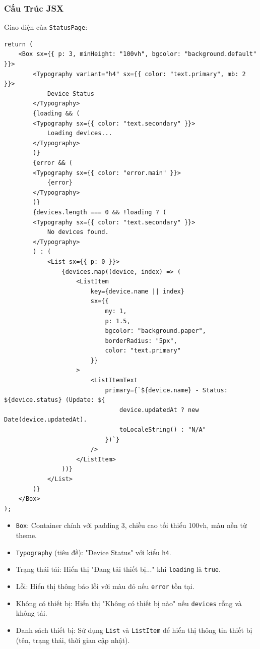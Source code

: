             \subsubsection{Cấu Trúc JSX}
                \hspace*{0.6cm}Giao diện của \texttt{StatusPage}:
                \begin{lstlisting}
return (
    <Box sx={{ p: 3, minHeight: "100vh", bgcolor: "background.default" }}>
        <Typography variant="h4" sx={{ color: "text.primary", mb: 2 }}>
            Device Status
        </Typography>
        {loading && (
        <Typography sx={{ color: "text.secondary" }}>
            Loading devices...
        </Typography>
        )}
        {error && (
        <Typography sx={{ color: "error.main" }}>
            {error}
        </Typography>
        )}
        {devices.length === 0 && !loading ? (
        <Typography sx={{ color: "text.secondary" }}>
            No devices found.
        </Typography>
        ) : (
            <List sx={{ p: 0 }}>
                {devices.map((device, index) => (
                    <ListItem
                        key={device.name || index}
                        sx={{
                            my: 1,
                            p: 1.5,
                            bgcolor: "background.paper",
                            borderRadius: "5px",
                            color: "text.primary"
                        }}
                    >
                        <ListItemText
                            primary={`${device.name} - Status: ${device.status} (Update: ${
                                device.updatedAt ? new Date(device.updatedAt).
                                toLocaleString() : "N/A"
                            })`}
                        />
                    </ListItem>
                ))}
            </List>
        )}  
    </Box>
);
                \end{lstlisting}
                \begin{itemize}
                    \item \texttt{Box}: Container chính với padding 3, chiều cao tối thiểu 100vh, màu nền từ theme.
                    \item \texttt{Typography} (tiêu đề): "Device Status" với kiểu \texttt{h4}.
                    \item Trạng thái tải: Hiển thị "Đang tải thiết bị..." khi \texttt{loading} là \texttt{true}.
                    \item Lỗi: Hiển thị thông báo lỗi với màu đỏ nếu \texttt{error} tồn tại.
                    \item Không có thiết bị: Hiển thị "Không có thiết bị nào" nếu \texttt{devices} rỗng và không tải.
                    \item Danh sách thiết bị: Sử dụng \texttt{List} và \texttt{ListItem} để hiển thị thông tin thiết bị (tên, trạng thái, thời gian cập nhật).
                \end{itemize}

